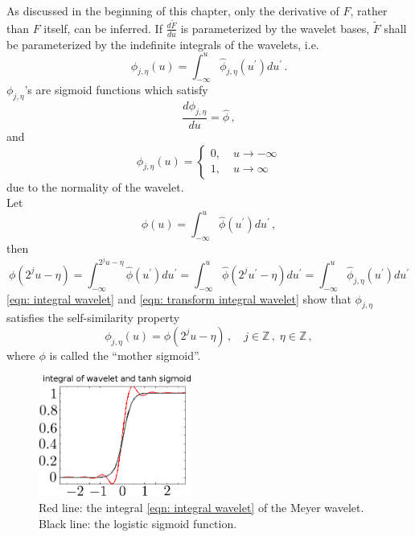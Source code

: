 As discussed in the beginning of this chapter, only the derivative of $F$, rather than 
$F$ itself, can be inferred.
If $\frac{d \tilde{F}}{du}$ is parameterized by the wavelet bases, 
$\tilde{F}$ shall be parameterized by the indefinite integrals of the wavelets, i.e.
\begin{equation}
    \phi_{j,\eta}(u) = \int_{-\infty}^u \hat{\phi}_{j,\eta}(u^\prime) du^\prime\,.
    \label{eqn: integral wavelet}
\end{equation}
$\phi_{j,\eta}$'s are sigmoid functions which satisfy
\begin{equation}
    \frac{d\phi_{j,\eta}}{du} = \hat{\phi}\,,
\end{equation}
and
\begin{equation}
    \phi_{j,\eta}(u) = \left\{
        \begin{split}
            0,&\; u\rightarrow -\infty\\
            1,&\; u\rightarrow \infty
        \end{split}\right.
\end{equation}
due to the normality of the wavelet.\\

Let 
\begin{equation}
    \phi(u) = \int_{-\infty}^u \hat{\phi}(u^\prime) du^\prime\,,
    \label{eqn: integral wavelet basis}
\end{equation}
then
\begin{equation}
    \phi(2^j u-\eta) = \int_{-\infty}^{2^j u-\eta} \hat{\phi}(u^\prime) du^\prime
    = \int_{-\infty}^{u} \hat{\phi} (2^j u^\prime - \eta) du^\prime=
    \int_{-\infty}^u \hat{\phi}_{j,\eta} (u^\prime) du^\prime
    \label{eqn: transform integral wavelet}
\end{equation}
\eqref{eqn: integral wavelet} and \eqref{eqn: transform integral wavelet} show that
$\phi_{j,\eta}$ satisfies the self-similarity property
\begin{equation}
    {\phi}_{j,\eta}(u) = {\phi}(2^j u-\eta) \,,\quad j\in \mathbb{Z} \,,\;\eta \in \mathbb{Z}\,,
    \label{eqn: self similar sigmoid}
\end{equation}
where $\phi$ is called the ``mother sigmoid''.\\

\begin{figure}[Htbp]\begin{center}
    \includegraphics[width=5cm, height=4cm]{../basis_combined.png}
    \caption{Red line: the integral \eqref{eqn: integral wavelet} of the Meyer wavelet.
             Black line: the logistic sigmoid function.}
    \label{fig: sigmoid}
\end{center}\end{figure}


